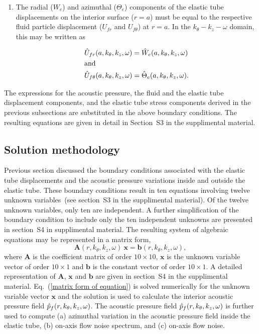 \documentclass[11pt,cleanfoot]{asme2ej}
\begin{document}
\begin{enumerate}
     \item The radial ($W_e$) and azimuthal ($\Theta_e$) components of the elastic tube displacements on the interior surface ($r=a$) must be equal to the respective fluid particle displacement ($U_{fr}$ and $U_{f\theta}$) at $r=a$. In the $k_\theta-k_z-\omega$ domain, this may be written as

     \begin{align}
        &\Hat{U}_{fr}(a,k_\theta,k_{z},\omega) = \Hat{W}_{e}(a,k_\theta,k_{z},\omega)\label{BC9 3d}\\ 
    &\text{and} \nonumber \\
        &\Hat{U}_{f\theta}(a,k_\theta,k_{z},\omega) = \Hat{\Theta}_{e}(a,k_\theta,k_{z},\omega)\label{BC10 3d}.
    \end{align}
    \end{enumerate}
The expressions for the acoustic pressure, the fluid and the elastic tube displacement components, and the elastic tube stress components derived in the previous subsections are substituted in the above boundary conditions. The resulting equations are given in detail in Section~S3 in the supplimental material.

\subsection{Solution methodology}\label{solution methods}
Previous section discussed the boundary conditions associated with the elastic tube displacements and the acoustic pressure variations inside and outside the elastic tube. These boundary conditions result in ten equations involving twelve unknown variables~(see section~S3 in the supplimental material). Of the twelve unknown variables, only ten are independent. A further simplification of the boundary condition to include only the ten independent unknowns are presented in section~S4 in supplimental material. The resulting system of algebraic equations may be represented in a matrix form,
\begin{equation}\label{matrix form of equation}
    \mathbf{A}(r,k_\theta,k_z,\omega)~\mathbf{x} = \mathbf{b}(r,k_\theta,k_z,\omega),   
\end{equation}
where $\mathbf{A}$ is the coefficient matrix of order $10\times10$, $\mathbf{x}$ is the unknown variable vector of order $10\times1$ and $\mathbf{b}$ is the constant vector of order $10\times1$. A detailed representation of $\mathbf{A}$, $\mathbf{x}$ and $\mathbf{b}$ are given in section~S4 in the supplimental material. Eq.~(\ref{matrix form of equation}) is solved numerically for the unknown variable vector $\mathbf{x}$ and the solution is used to calculate the interior acoustic pressure field $\Hat{p}_f(r,k_\theta,k_z,\omega)$. The acoustic pressure field $\Hat{p}_f(r,k_\theta,k_z,\omega)$ is further used to compute (a) azimuthal variation in the acoustic pressure field inside the elastic tube, (b) on-axis flow noise spectrum, and (c) on-axis flow noise.
\end{document}
